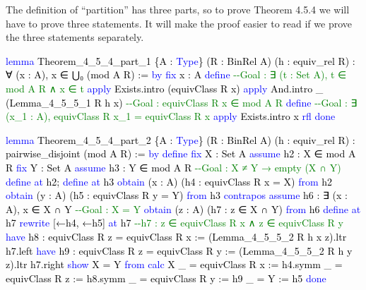 \documentclass[
  letterpaper,
  DIV=11,
  numbers=noendperiod]{scrreprt}
\newenvironment{Shaded}{\begin{snugshade}}{\end{snugshade}}
\newcommand{\CommentTok}[1]{\textcolor[rgb]{0.37,0.37,0.37}{#1}}
\newcommand{\KeywordTok}[1]{\textcolor[rgb]{0.00,0.23,0.31}{#1}}
\newcommand{\NormalTok}[1]{\textcolor[rgb]{0.00,0.23,0.31}{#1}}
\renewcommand{\NormalTok}[1]{\textcolor[HTML]{000000}{#1}}
\renewcommand{\KeywordTok}[1]{\textcolor[HTML]{0000FF}{#1}}
\renewcommand{\CommentTok}[1]{\textcolor[HTML]{008000}{#1}}
\theoremstyle{remark}
\begin{document}
The definition of ``partition'' has three parts, so to prove Theorem
4.5.4 we will have to prove three statements. It will make the proof
easier to read if we prove the three statements separately.

\begin{Shaded}
\begin{Highlighting}[]
\KeywordTok{lemma}\NormalTok{ Theorem\_4\_5\_4\_part\_1 \{A : }\KeywordTok{Type}\NormalTok{\} (R : BinRel A) (h : equiv\_rel R) :}
\NormalTok{    ∀ (x : A), x ∈ ⋃₀ (mod A R) := }\KeywordTok{by}
  \KeywordTok{fix}\NormalTok{ x : A}
  \KeywordTok{define}        \CommentTok{{-}{-}Goal : ∃ (t : Set A), t ∈ mod A R ∧ x ∈ t}
  \KeywordTok{apply}\NormalTok{ Exists.intro (equivClass R x)}
  \KeywordTok{apply}\NormalTok{ And.intro \_ (Lemma\_4\_5\_5\_1 R h x)}
                \CommentTok{{-}{-}Goal : equivClass R x ∈ mod A R}
  \KeywordTok{define}        \CommentTok{{-}{-}Goal : ∃ (x\_1 : A), equivClass R x\_1 = equivClass R x}
  \KeywordTok{apply}\NormalTok{ Exists.intro x}
  \KeywordTok{rfl}
  \KeywordTok{done}

\KeywordTok{lemma}\NormalTok{ Theorem\_4\_5\_4\_part\_2 \{A : }\KeywordTok{Type}\NormalTok{\} (R : BinRel A) (h : equiv\_rel R) :}
\NormalTok{    pairwise\_disjoint (mod A R) := }\KeywordTok{by}
  \KeywordTok{define}
  \KeywordTok{fix}\NormalTok{ X : Set A}
  \KeywordTok{assume}\NormalTok{ h2 : X ∈ mod A R}
  \KeywordTok{fix}\NormalTok{ Y : Set A}
  \KeywordTok{assume}\NormalTok{ h3 : Y ∈ mod A R           }\CommentTok{{-}{-}Goal : X ≠ Y → empty (X ∩ Y)}
  \KeywordTok{define} \KeywordTok{at}\NormalTok{ h2; }\KeywordTok{define} \KeywordTok{at}\NormalTok{ h3}
  \KeywordTok{obtain}\NormalTok{ (x : A) (h4 : equivClass R x = X) }\KeywordTok{from}\NormalTok{ h2}
  \KeywordTok{obtain}\NormalTok{ (y : A) (h5 : equivClass R y = Y) }\KeywordTok{from}\NormalTok{ h3}
  \KeywordTok{contrapos}
  \KeywordTok{assume}\NormalTok{ h6 : ∃ (x : A), x ∈ X ∩ Y  }\CommentTok{{-}{-}Goal : X = Y}
  \KeywordTok{obtain}\NormalTok{ (z : A) (h7 : z ∈ X ∩ Y) }\KeywordTok{from}\NormalTok{ h6}
  \KeywordTok{define} \KeywordTok{at}\NormalTok{ h7}
  \KeywordTok{rewrite}\NormalTok{ [←h4, ←h5] }\KeywordTok{at}\NormalTok{ h7 }\CommentTok{{-}{-}h7 : z ∈ equivClass R x ∧ z ∈ equivClass R y}
  \KeywordTok{have}\NormalTok{ h8 : equivClass R z = equivClass R x :=}
\NormalTok{    (Lemma\_4\_5\_5\_2 R h x z).ltr h7.left}
  \KeywordTok{have}\NormalTok{ h9 : equivClass R z = equivClass R y :=}
\NormalTok{    (Lemma\_4\_5\_5\_2 R h y z).ltr h7.right}
  \KeywordTok{show}\NormalTok{ X = Y }\KeywordTok{from}
    \KeywordTok{calc}\NormalTok{ X}
\NormalTok{      \_ = equivClass R x := h4.symm}
\NormalTok{      \_ = equivClass R z := h8.symm}
\NormalTok{      \_ = equivClass R y := h9}
\NormalTok{      \_ = Y              := h5}
  \KeywordTok{done}


\end{Highlighting}
\end{Shaded}
\end{document}
